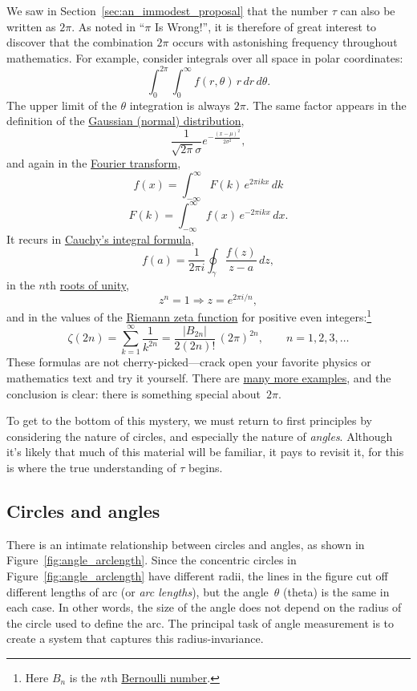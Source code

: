 We saw in Section~\ref{sec:an_immodest_proposal} that the number $\tau$ can also be written as $2\pi$. As noted in ``$\pi$ Is Wrong!'', it is therefore of great interest to discover that the combination $2\pi$ occurs with astonishing frequency throughout mathematics. For example, consider integrals over all space in polar coordinates:
\[
  \int_0^{2\pi}\int_0^\infty f(r, \theta)\, r\, dr\, d\theta.
\]
The upper limit of the $\theta$ integration is always $2\pi$. The same factor appears in the definition of the \href{https://en.wikipedia.org/wiki/Normal_distribution}{Gaussian (normal) distribution},
\[
  \frac{1}{\sqrt{2\pi}\sigma}e^{-\frac{(x-\mu)^2}{2\sigma^2}},
\]
and again in the \href{http://mathworld.wolfram.com/FourierTransform.html}{Fourier transform},
\[
  f(x) = \int_{-\infty}^\infty F(k)\, e^{2\pi ikx}\,dk
\]
\[
    F(k) = \int_{-\infty}^\infty f(x)\, e^{-2\pi ikx}\,dx.
\]
It recurs in \href{https://en.wikipedia.org/wiki/Cauchy's_integral_formula}{Cauchy's integral formula},
\[
  f(a) = \frac{1}{2\pi i}\oint_\gamma\frac{f(z)}{z-a}\,dz,
\]
in the $n$th \href{https://en.wikipedia.org/wiki/Root_of_unity}{roots of unity},
\[
  z^n = 1 \Rightarrow z = e^{2\pi i/n},
\]
and in the values of the \href{https://en.wikipedia.org/wiki/Riemann_zeta_function}{Riemann zeta function} for positive even integers:\footnote{Here $B_n$ is the $n$th \href{https://en.wikipedia.org/wiki/Bernoulli_number}{Bernoulli number}.}
\[
  \zeta(2n) = \sum_{k=1}^\infty \frac{1}{k^{2n}} = \frac{|B_{2n}|}{2(2n)!}\,(2\pi)^{2n},\qquad n = 1, 2, 3, \ldots
\]
These formulas are not cherry-picked---crack open your favorite physics or mathematics text and try it yourself. There are \href{http://www.harremoes.dk/Peter/Undervis/Turnpage/Turnpage1.html}{many more examples}, and the conclusion is clear: there is something special about~$2\pi$.

To get to the bottom of this mystery, we must return to first principles by considering the nature of circles, and especially the nature of \emph{angles}. Although it's likely that much of this material will be familiar, it pays to revisit it, for this is where the true understanding of $\tau$ begins.

  \subsection{Circles and angles} %
  \label{sec:circles_and_angles}

There is an intimate relationship between circles and angles, as shown in Figure~\ref{fig:angle_arclength}. Since the concentric circles in Figure~\ref{fig:angle_arclength} have different radii, the lines in the figure cut off different lengths of arc (or \emph{arc lengths}), but the angle~$\theta$ (theta) is the same in each case. In other words, the size of the angle does not depend on the radius of the circle used to define the arc. The principal task of angle measurement is to create a system that captures this radius-invariance.


